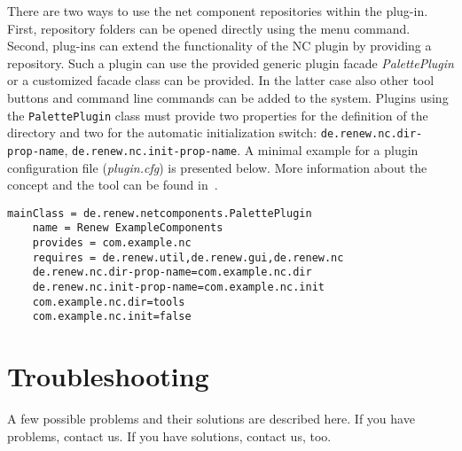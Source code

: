 There are two ways to use the net component repositories within the
plug-in.
%
First, repository folders can be opened directly using the menu command.
%
Second, plug-ins can extend the functionality of the NC plugin by
providing a repository.
%
Such a plugin can use the provided generic plugin facade
\emph{PalettePlugin} or a customized facade class can be provided.
% 
In the latter case also other tool buttons and command line commands
can be added to the system.
%
Plugins using the \texttt{PalettePlugin} class must provide two
properties for the definition of the directory and two for the
automatic initialization switch: \texttt{de.renew.nc.dir-prop-name},
\texttt{de.renew.nc.init-prop-name}.
%
A minimal example for a plugin configuration file (\emph{plugin.cfg})
is presented below.
%
More information about the concept and the tool can be found
in~\cite{Cabac09c}.

\begin{lstlisting}[style=xnonfloating]
    mainClass = de.renew.netcomponents.PalettePlugin
    name = Renew ExampleComponents
    provides = com.example.nc
    requires = de.renew.util,de.renew.gui,de.renew.nc
    de.renew.nc.dir-prop-name=com.example.nc.dir
    de.renew.nc.init-prop-name=com.example.nc.init
    com.example.nc.dir=tools
    com.example.nc.init=false
\end{lstlisting}

\section{Troubleshooting}

A few possible problems and their solutions are described here.
If you have problems, contact us. If you have solutions,
contact us, too.

